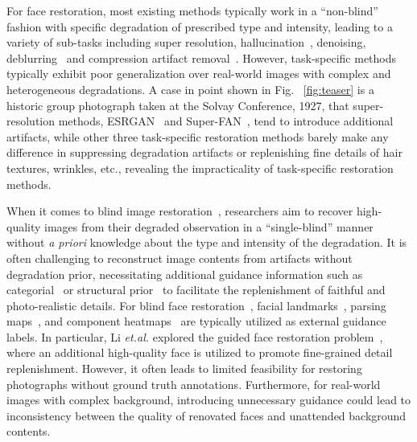 \documentclass[sigconf]{acmart}
\begin{document}
For face restoration, most existing methods typically work in a ``non-blind'' fashion with specific degradation of prescribed type and intensity, leading to a variety of sub-tasks including super resolution\cite{sr_review}\cite{srcnn}\cite{edsr}\cite{esrgan}, hallucination~\cite{fh_review}\cite{face_hallu_4}, denoising\cite{RIDNet}\cite{VDNet}, deblurring~\cite{deblurring_survey}\cite{DeblurGAN}\cite{DeblurGANv2} and compression artifact removal~\cite{com_art_reduction_survey}\cite{ARCNN}\cite{EPGAN}. However, task-specific methods typically exhibit poor generalization over real-world images with complex and heterogeneous degradations. A case in point shown in Fig. ~\ref{fig:teaser} is a historic group photograph taken at the Solvay Conference, 1927, that super-resolution methods, ESRGAN~\cite{esrgan} and Super-FAN~\cite{SuperFAN}, tend to introduce additional artifacts, while other three task-specific restoration methods barely make any difference in suppressing degradation artifacts or replenishing fine details of hair textures, wrinkles, etc., revealing the impracticality of task-specific restoration methods.

When it comes to blind image restoration~\cite{BIR_original}, researchers aim to recover high-quality images from their degraded observation in a ``single-blind'' manner without \emph{a priori} knowledge about the type and intensity of the degradation. It is often challenging to reconstruct image contents from artifacts without degradation prior, necessitating additional guidance information such as categorial~\cite{CategorySpecificID} or structural prior~\cite{FSRNet} to facilitate the replenishment of faithful and photo-realistic details. For blind face restoration~\cite{MultiScaleFR-AAAI2018}\cite{SGEN}, facial landmarks~\cite{SuperFAN}, parsing maps~\cite{pix2pixHD}, and component heatmaps~\cite{faceSR_ECCV2018} are typically utilized as external guidance labels. In particular, Li \emph{et.al.} explored the guided face restoration problem~\cite{BlindFR-ECCV2018}\cite{EnhancedBlindFR-CVPR2020}, where an additional high-quality face is utilized to promote fine-grained detail replenishment. However, it often leads to limited feasibility for restoring photographs without ground truth annotations. Furthermore, for real-world images with complex background, introducing unnecessary guidance could lead to inconsistency between the quality of renovated faces and unattended background contents.
\end{document}
